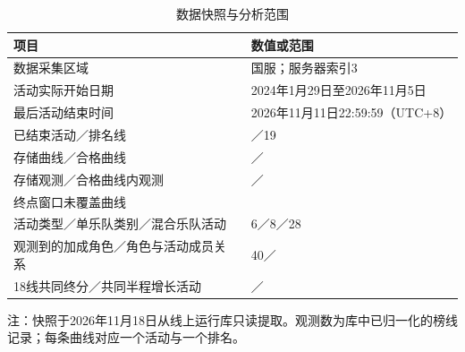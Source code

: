 \begin{table}[!htbp]
\centering\small
\caption{数据快照与分析范围}\label{tab:cohort}
\setlength{\tabcolsep}{4pt}
\renewcommand{\arraystretch}{1.15}
\begin{tabularx}{\linewidth}{l L}
\toprule
项目 & 数值或范围 \\
\midrule
数据采集区域 & 国服；服务器索引3 \\
活动实际开始日期 & 2024年1月29日至2026年11月5日 \\
最后活动结束时间 & 2026年11月11日22:59:59（UTC+8） \\
已结束活动／排名线 & \NumEvents{}／19 \\
存储曲线／合格曲线 & \NumSourceCurves{}／\NumValidCurves{} \\
存储观测／合格曲线内观测 & \NumPoints{}／\NumValidPoints{} \\
终点窗口未覆盖曲线 & \NumExcluded{} \\
活动类型／单乐队类别／混合乐队活动 & 6／8／28 \\
观测到的加成角色／角色与活动成员关系 & 40／\NumCharacterMemberships{} \\
18线共同终分／共同半程增长活动 & \NumCoreEvents{}／\NumCorrelationEvents{} \\
\bottomrule
\end{tabularx}
\par\vspace{4pt}
\begin{minipage}{\linewidth}\footnotesize{}
注：快照于2026年11月18日从线上运行库只读提取。观测数为库中已归一化的榜线记录；每条曲线对应一个活动与一个排名。
\end{minipage}
\end{table}
